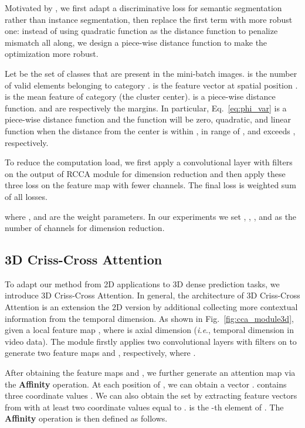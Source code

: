 \documentclass[10pt,journal,compsoc]{IEEEtran}
\def\ie{\emph{i.e}.} \def\Ie{\emph{I.e}.}
\newcommand{\red}[1]{#1}
\begin{document}
Motivated by \cite{de2017semantic}, we first adapt a discriminative loss for semantic segmentation rather than instance segmentation, then replace the first term with more robust one: instead of using quadratic function as the distance function to penalize mismatch all along, we design a piece-wise distance function to make the optimization more robust.

Let  be the set of classes that are present in the mini-batch images.  is the number of valid elements belonging to category .  is the feature vector at spatial position .  is the mean feature of category  (the cluster center).  is a piece-wise distance function.  and  are respectively the margins. \red{
In particular, Eq.~\ref{eq:phi_var} is a piece-wise distance function and the function  will be zero, quadratic, and linear function when the distance from the center  is within , in range of , and exceeds , respectively.}

    
    
    
    
    
    
    
    
    

To reduce the computation load, we first apply a convolutional layer with  filters on the output of RCCA module for dimension reduction and then apply these three loss on the feature map with fewer channels. The final loss  is weighted sum of all losses.

where ,  and  are the weight parameters. In our experiments we set , , ,  and  as the number of channels for dimension reduction. 

\subsection{3D Criss-Cross Attention}

To adapt our method from 2D applications to 3D dense prediction tasks, we introduce 3D Criss-Cross Attention. In general, the architecture of 3D Criss-Cross Attention is an extension the 2D version by additional collecting more contextual information from the temporal dimension. As shown in Fig.~\ref{fig:cca_module3d}, given a local feature map , where  is axial dimension (\ie, temporal dimension in video data). The module firstly applies two convolutional layers with  filters on  to generate two feature maps  and , respectively, where . 

After obtaining the feature maps  and , we further generate an attention map  via the \textbf{Affinity} operation. At each position  of , we can obtain a vector .  contains three coordinate values .
We can also obtain the set  by extracting feature vectors from  with at least two coordinate values equal to . 
 is the -th element of .
The \textbf{Affinity} operation is then defined as follows.
    
\end{document}
